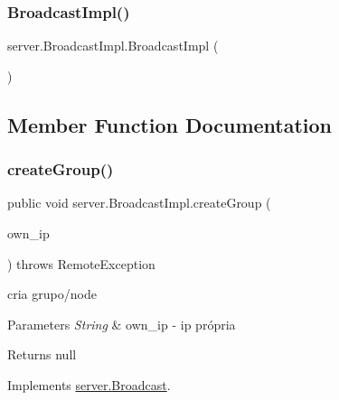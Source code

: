 \subsubsection{\texorpdfstring{Broadcast\+Impl()}{BroadcastImpl()}}
{\footnotesize\ttfamily server.\+Broadcast\+Impl.\+Broadcast\+Impl (\begin{DoxyParamCaption}{ }\end{DoxyParamCaption})}



\subsection{Member Function Documentation}
\mbox{\label{classserver_1_1_broadcast_impl_a433529db2e96faf096881d1c38033b45}} 
\subsubsection{\texorpdfstring{create\+Group()}{createGroup()}}
{\footnotesize\ttfamily public void server.\+Broadcast\+Impl.\+create\+Group (\begin{DoxyParamCaption}\item[{String}]{own\+\_\+ip }\end{DoxyParamCaption}) throws Remote\+Exception}



cria grupo/node 


\begin{DoxyParams}{Parameters}
{\em String} & own\+\_\+ip -\/ ip própria \\
\hline
\end{DoxyParams}
\begin{DoxyReturn}{Returns}
null 
\end{DoxyReturn}


Implements \hyperlink{interfaceserver_1_1_broadcast_a1a8d1242a9c00acd3347ae64debe214d}{server.\+Broadcast}.

\mbox{\label{classserver_1_1_broadcast_impl_a35a07b1f98aaaa51493cd6ff28d6b90d}} 

